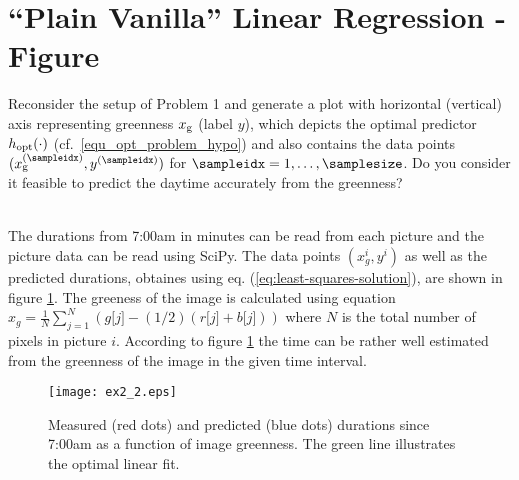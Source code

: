 \documentclass[article,11pt]{article}
\begin{document}
\newpage
\section{``Plain Vanilla'' Linear Regression - Figure}
\label{problem_1}

Reconsider the setup of Problem 1 and generate a plot with horizontal (vertical) axis representing greenness $x_{\rm g}$ (label $y$), which depicts the optimal predictor 
$h_{\rm opt}(\cdot)$ (cf.\ \eqref{equ_opt_problem_hypo}) and also contains the data points $(x_{\rm g}^{(\sampleidx)},y^{(\sampleidx)})$ for $\sampleidx=1,\ldots,\samplesize$. 
Do you consider it feasible to predict the daytime accurately from the greenness?

\\
The durations from 7:00am in minutes can be read from each picture and the
picture data can be read using SciPy. The data points $(x_g^i, y^i)$ as well as
the predicted durations, obtaines using eq. (\ref{eq:least-squares-solution}),
are shown in figure \ref{fig:linearregression}. The greeness of the image is
calculated using equation $x_g=\frac{1}{N}\sum_{j=1}^N(g\lbrack j\rbrack -(1/2)(r\lbrack j\rbrack+b\lbrack j\rbrack ))$ where $N$ is the total number of pixels in picture $i$. According to figure
\ref{fig:linearregression} the time can be rather well estimated from the
greenness of the image in the given time interval.
\begin{figure}[!h]
  \centering
  \texttt{[image: ex2\_2.eps]}
  \caption{Measured (red dots) and predicted (blue dots) durations since 7:00am
    as a function of image greenness. The green line illustrates the optimal
    linear fit.}
  \label{fig:linearregression}
\end{figure}

\newpage


\newpage
\end{document}
